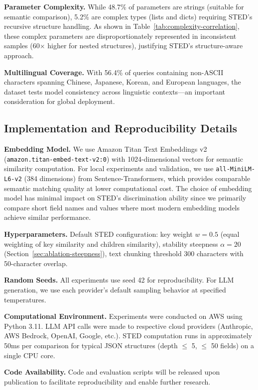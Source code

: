 \documentclass{article}
\theoremstyle{plain}
\theoremstyle{definition}
\begin{document}
\textbf{Parameter Complexity.} While 48.7\% of parameters are strings (suitable for semantic comparison), 5.2\% are complex types (lists and dicts) requiring STED's recursive structure handling. As shown in Table~\ref{tab:complexity-correlation}, these complex parameters are disproportionately represented in inconsistent samples (60$\times$ higher for nested structures), justifying STED's structure-aware approach.

\textbf{Multilingual Coverage.} With 56.4\% of queries containing non-ASCII characters spanning Chinese, Japanese, Korean, and European languages, the dataset tests model consistency across linguistic contexts---an important consideration for global deployment.

\subsection{Implementation and Reproducibility Details}
\label{subsec:reproducibility}

\textbf{Embedding Model.} We use Amazon Titan Text Embeddings v2 (\texttt{amazon.titan-embed-text-v2:0}) with 1024-dimensional vectors for semantic similarity computation. For local experiments and validation, we use \texttt{all-MiniLM-L6-v2} (384 dimensions) from Sentence-Transformers, which provides comparable semantic matching quality at lower computational cost. The choice of embedding model has minimal impact on STED's discrimination ability since we primarily compare short field names and values where most modern embedding models achieve similar performance.

\textbf{Hyperparameters.} Default STED configuration: key weight $w = 0.5$ (equal weighting of key similarity and children similarity), stability steepness $\alpha = 20$ (Section~\ref{sec:ablation-steepness}), text chunking threshold 300 characters with 50-character overlap.

\textbf{Random Seeds.} All experiments use seed 42 for reproducibility. For LLM generation, we use each provider's default sampling behavior at specified temperatures.

\textbf{Computational Environment.} Experiments were conducted on AWS using Python 3.11. LLM API calls were made to respective cloud providers (Anthropic, AWS Bedrock, OpenAI, Google, etc.). STED computation runs in approximately 50ms per comparison for typical JSON structures (depth $\leq$ 5, $\leq$ 50 fields) on a single CPU core.

\textbf{Code Availability.} Code and evaluation scripts will be released upon publication to facilitate reproducibility and enable further research.
\end{document}
